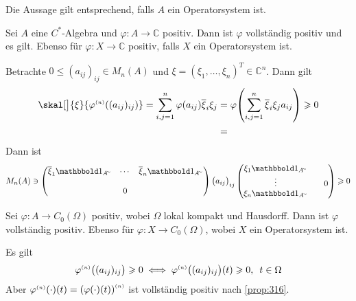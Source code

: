 \begin{bemerkung}[label=bem:315]
	Die Aussage gilt entsprechend, falls $A$ ein Operatorsystem ist.
\end{bemerkung}

\begin{proposition}[label=prop:316]
	Sei $A$ eine $C^*$-Algebra und $\varphi \colon A \to \mathbb{C}$ positiv.
	Dann ist $\varphi$ vollständig positiv und es gilt.
	Ebenso für $\varphi \colon X \to \mathbb{C}$ positiv, falls $X$ ein Operatorsystem ist.
\end{proposition}
\begin{beweis}
	Betrachte $0 \le (a_{ij})_{ij} \in M_n(A)$ und $\xi= (\xi_1, \ldots ,\xi_n)^T \in \mathbb{C}^n$.
	Dann gilt
	\begin{align}
		\skal[\big]{\xi}{\varphi^\ssbrace{n} \enbrace*{(a_{ij})_{ij}}} = \sum_{i,j=1}^n \varphi(a_{ij}) \overline{\xi}_i \xi_j &= \varphi \enbrace*{\sum_{i,j=1}^n \overline{\xi}_i \xi_j a_{ij}} \ge 0 \\
		&= 
	\end{align}
	Dann ist 
	\[
		M_n(A) \ni \begin{pmatrix}
					\overline{\xi}_1 \ind_{A^\simm} & \cdots & \overline{\xi}_n \ind_{A^\simm} \\
					& &  \\
					& 0 & 
				\end{pmatrix}\enbrace[\big]{a_{ij}}_{ij} 
				\begin{pmatrix}
					\xi_1 \ind_{A^\simm} & & \\
					\vdots & & 0 \\
					\xi_n \ind_{A^\simm}  & & 
				\end{pmatrix} \ge 0
	\]
\end{beweis}

\begin{korollar}[label=kor:317]
	Sei $\varphi \colon A \to C_0(\Omega)$ positiv, wobei $\Omega$ lokal kompakt und Hausdorff.
	Dann ist $\varphi$ vollständig positiv.
	Ebenso für $\varphi \colon X \to C_0(\Omega)$, wobei $X$ ein Operatorsystem ist.
\end{korollar}
\begin{beweis}
	Es gilt
	\[
		\varphi^\ssbrace{n} \enbrace[\big]{(a_{ij})_{ij}} \ge 0 \iff \varphi^\ssbrace{n} \enbrace[\big]{(a_{ij})_{ij}}(t) \ge 0 , \enspace t \in \Omega
	\]
	Aber $\varphi^\ssbrace{n}(\cdot )(t) = \enbrace*{\varphi(\cdot )(t)}^\ssbrace{n}$ ist vollständig positiv nach \autoref{prop:316}.
\end{beweis}

